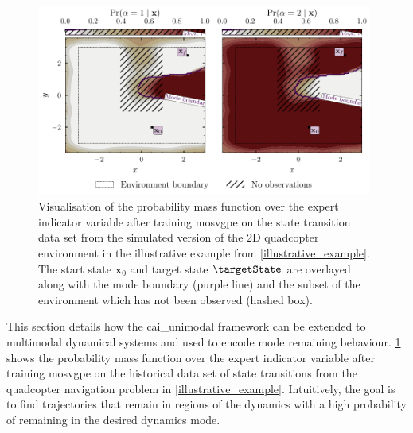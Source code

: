\documentclass{mimosis-class/mimosis}
\numberwithin{equation}{chapter}
\newcommand{\state}{\ensuremath{\mathbf{x}}}
\begin{document}
{\renewcommand{\transitionVarDistK}{\ensuremath{q(\state_{\timeInd+1} \mid \state_0, \modeVarTraj_{0:\timeInd})}}
\begin{figure}[t!]
\centering
\includegraphics[width=0.98\textwidth]{./images/mode-opt/env/scenario_7/mosvgpe/mixing_probs_no_obs.pdf}
\caption[\acrshort{mosvgpe}'s mixing probabilities after training on simulated quadcopter data set from Environment 1]{
Visualisation of the probability mass function over the expert indicator variable after training \acrshort{mosvgpe}
on the state transition data set from the simulated version of the 2D quadcopter environment
in the illustrative example from \cref{illustrative_example}.
The start state $\state_0$ and target state $\targetState$ are overlayed along with the mode boundary (purple line)
and the subset of the environment which has not been observed (hashed box).}
\label{eq-traj-opt-gating-network-prob-post-inf}
\end{figure}
This section details how the \acrfull{cai_unimodal} framework can be extended to multimodal dynamical systems and
used to encode mode remaining behaviour.
\cref{eq-traj-opt-gating-network-prob-post-inf} shows the probability mass function over the expert indicator variable
after training \acrshort{mosvgpe} on the historical data set of state transitions from the
quadcopter navigation problem in \cref{illustrative_example}.
Intuitively, the goal is to find trajectories that remain in regions of the dynamics with a high probability of
remaining in the desired dynamics mode.

\begin{figure}[t!]
  \centering
   \resizebox{0.4\textwidth}{!}{
    \begin{tikzpicture}[
      pre/.style={<-,shorten <=0.4pt,>=stealth',semithick},
      post/.style={->,shorten >=0.4pt,>=stealth',semithick}
      ]
      \node[obs] (x1) {$\state_0$};
      \node[latent, right=of x1] (x2) {$\state_1$};
      \node[latent, right=of x2] (x3) {$\state_2$};
      \node[latent, right=of x3] (x4) {$\state_3$};


\end{tikzpicture}}
\end{figure}}
\end{document}
